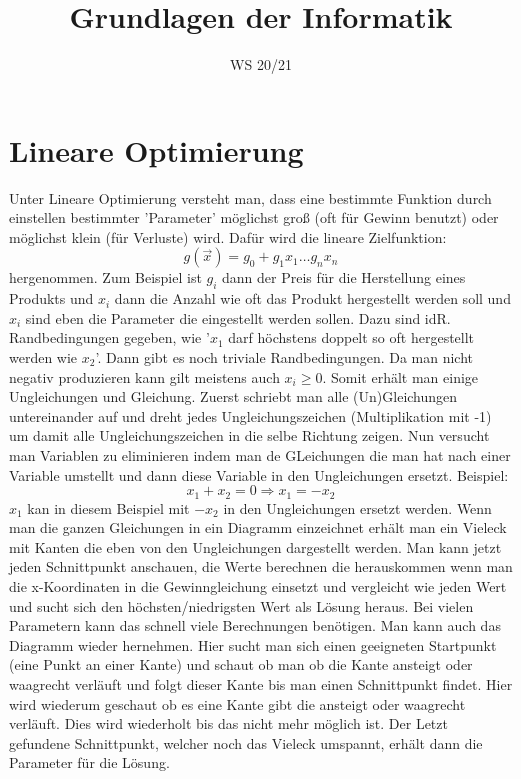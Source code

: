 \documentclass[a4paper]{scrartcl}
\author{}
\date{WS 20/21}
\title{Grundlagen der Informatik}
\begin{document}
    \maketitle
    \newpage
    \tableofcontents
    \newpage

    \section{Lineare Optimierung}
    Unter Lineare Optimierung versteht man, dass eine bestimmte Funktion durch einstellen bestimmter 'Parameter' möglichst groß (oft für Gewinn benutzt) oder möglichst klein (für Verluste) wird.
    Dafür wird die lineare Zielfunktion: 
    \begin{equation*}
        g(\vec{x}) = g_0 + g_1x_1 \ldots g_nx_n
    \end{equation*}
    hergenommen. Zum Beispiel ist \(g_i\) dann der Preis für die Herstellung eines Produkts und \(x_i\) dann die Anzahl wie oft das Produkt hergestellt werden soll und \(x_i\) sind eben die 
    Parameter die eingestellt werden sollen. Dazu sind idR. Randbedingungen gegeben, wie '\(x_1\) darf höchstens doppelt so oft hergestellt werden wie \(x_2\)'. Dann gibt es noch triviale 
    Randbedingungen. Da man nicht negativ produzieren kann gilt meistens auch \(x_i \ge 0\). Somit erhält man einige Ungleichungen und Gleichung. Zuerst schriebt man alle (Un)Gleichungen 
    untereinander auf und dreht jedes Ungleichungszeichen (Multiplikation mit -1) um damit alle Ungleichungszeichen in die selbe Richtung zeigen. Nun versucht man Variablen zu eliminieren
    indem man de GLeichungen die man hat nach einer Variable umstellt und dann diese Variable in den Ungleichungen ersetzt. Beispiel:
    \begin{equation*}
        x_1 + x_2 = 0 \Rightarrow x_1 = -x_2    
    \end{equation*}
    \(x_1\) kan in diesem Beispiel mit \(-x_2\) in den Ungleichungen ersetzt werden. Wenn man die ganzen Gleichungen in ein Diagramm einzeichnet erhält man ein Vieleck mit Kanten die eben 
    von den Ungleichungen dargestellt werden. Man kann jetzt jeden Schnittpunkt anschauen, die Werte berechnen die herauskommen wenn man die x-Koordinaten in die Gewinngleichung einsetzt und
    vergleicht wie jeden Wert und sucht sich den höchsten/niedrigsten Wert als Lösung heraus. Bei vielen Parametern kann das schnell viele Berechnungen benötigen. Man kann auch das Diagramm wieder
    hernehmen. Hier sucht man sich einen geeigneten Startpunkt (eine Punkt an einer Kante) und schaut ob man ob die Kante ansteigt oder waagrecht verläuft und folgt dieser Kante bis man 
    einen Schnittpunkt findet. Hier wird wiederum geschaut ob es eine Kante gibt die ansteigt oder waagrecht verläuft. Dies wird wiederholt bis das nicht mehr möglich ist. Der Letzt gefundene
    Schnittpunkt, welcher noch das Vieleck umspannt, erhält dann die Parameter für die Lösung. 
\end{document}
